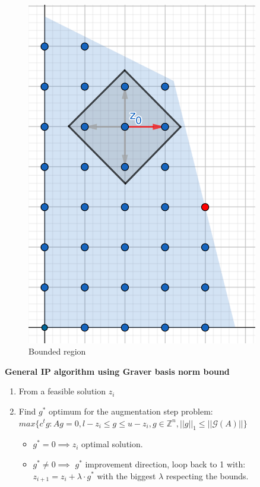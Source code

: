 \begin{figure}[h]
\begin{minipage}[b]{0.45\textwidth}
    \includegraphics[width=0.9\textwidth]{images/IP.png}
    \caption{Bounded region}
\end{minipage}
\end{figure}

\newpage
\label{GB_bound_algorithm}
\textbf{General IP algorithm using Graver basis norm bound}
\vspace{-8pt}
\begin{enumerate}
    \item From a feasible solution $z_i$
    \item Find $g^*$ optimum for the augmentation step problem: \vspace{4pt}\\
          $max\{c^tg : Ag = 0, l-z_i \leq g \leq u-z_i, g \in \mathbb{Z}^n, ||g||_1 \leq ||\mathcal{G}(A)|| \}$ \vspace{4pt}
    \begin{itemize}
        \item $g^* = 0 \implies z_i$ optimal solution.
        \item $g^* \neq 0 \implies$ $g^*$ improvement direction, loop back to 1 with:\\
        $z_{i+1} = z_i + \lambda \cdot g^*$ with the biggest $\lambda$ respecting the bounds.
    \end{itemize}
\end{enumerate}


